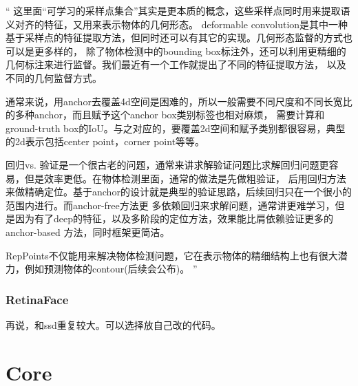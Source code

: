 \documentclass[UTF8]{ctexart}
\begin{document}
“
这里面“可学习的采样点集合”其实是更本质的概念，这些采样点同时用来提取语义对齐的特征，又用来表示物体的几何形态。
deformable convolution是其中一种基于采样点的特征提取方法，但同时还可以有其它的实现。几何形态监督的方式也可以是更多样的，
除了物体检测中的bounding box标注外，还可以利用更精细的几何标注来进行监督。我们最近有一个工作就提出了不同的特征提取方法，
以及不同的几何监督方式。

通常来说，用anchor去覆盖4d空间是困难的，所以一般需要不同尺度和不同长宽比的多种anchor，而且赋予这个anchor box类别标签也相对麻烦，
需要计算和ground-truth box的IoU。与之对应的，要覆盖2d空间和赋予类别都很容易，典型的2d表示包括center point，corner point等等。

回归vs. 验证是一个很古老的问题，通常来讲求解验证问题比求解回归问题更容易，但是效率更低。在物体检测里面，通常的做法是先做粗验证，
后用回归方法来做精确定位。基于anchor的设计就是典型的验证思路，后续回归只在一个很小的范围内进行。而anchor-free方法更
多依赖回归来求解问题，通常讲更难学习，但是因为有了deep的特征，以及多阶段的定位方法，效果能比肩依赖验证更多的anchor-based
方法，同时框架更简洁。

RepPoints不仅能用来解决物体检测问题，它在表示物体的精细结构上也有很大潜力，例如预测物体的contour(后续会公布)。
”


\subsubsection{RetinaFace}
再说，和ssd重复较大。可以选择放自己改的代码。

\section{Core}
\end{document}
